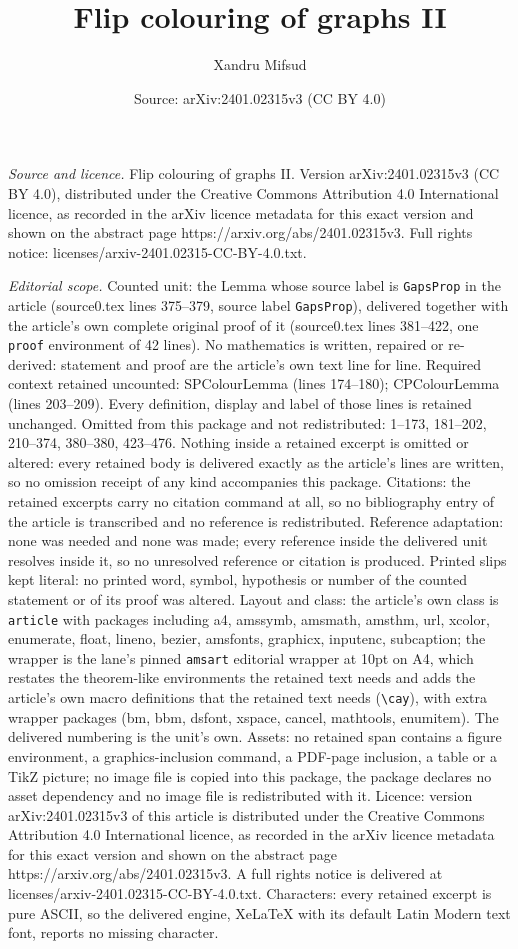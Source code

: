 \documentclass[10pt,a4paper]{amsart}
\title[Flip colouring of graphs II]{Flip colouring of graphs II}
\author{Xandru Mifsud}
\date{Source: arXiv:2401.02315v3 (CC BY 4.0)}
\begin{document}
\maketitle

\noindent\emph{Source and licence.} Flip colouring of graphs II. Version arXiv:2401.02315v3 (CC BY 4.0), distributed under the Creative Commons Attribution 4.0 International licence, as recorded in the arXiv licence metadata for this exact version and shown on the abstract page https://arxiv.org/abs/2401.02315v3. Full rights notice: licenses/arxiv-2401.02315-CC-BY-4.0.txt.\par\smallskip

\noindent\textit{Editorial scope.} Counted unit: the Lemma whose source label is \texttt{GapsProp} in the article (source0.tex lines 375--379, source label \texttt{GapsProp}), delivered together with the article's own complete original proof of it (source0.tex lines 381--422, one \texttt{proof} environment of 42 lines). No mathematics is written, repaired or re-derived: statement and proof are the article's own text line for line. Required context retained uncounted: SPColourLemma (lines 174--180); CPColourLemma (lines 203--209). Every definition, display and label of those lines is retained unchanged. Omitted from this package and not redistributed: 1--173, 181--202, 210--374, 380--380, 423--476. Nothing inside a retained excerpt is omitted or altered: every retained body is delivered exactly as the article's lines are written, so no omission receipt of any kind accompanies this package. Citations: the retained excerpts carry no citation command at all, so no bibliography entry of the article is transcribed and no reference is redistributed. Reference adaptation: none was needed and none was made; every reference inside the delivered unit resolves inside it, so no unresolved reference or citation is produced. Printed slips kept literal: no printed word, symbol, hypothesis or number of the counted statement or of its proof was altered. Layout and class: the article's own class is \texttt{article} with packages including a4, amssymb, amsmath, amsthm, url, xcolor, enumerate, float, lineno, bezier, amsfonts, graphicx, inputenc, subcaption; the wrapper is the lane's pinned \texttt{amsart} editorial wrapper at 10pt on A4, which restates the theorem-like environments the retained text needs and adds the article's own macro definitions that the retained text needs (\texttt{\textbackslash cay}), with extra wrapper packages (bm, bbm, dsfont, xspace, cancel, mathtools, enumitem). The delivered numbering is the unit's own. Assets: no retained span contains a figure environment, a graphics-inclusion command, a PDF-page inclusion, a table or a TikZ picture; no image file is copied into this package, the package declares no asset dependency and no image file is redistributed with it. Licence: version arXiv:2401.02315v3 of this article is distributed under the Creative Commons Attribution 4.0 International licence, as recorded in the arXiv licence metadata for this exact version and shown on the abstract page https://arxiv.org/abs/2401.02315v3. A full rights notice is delivered at licenses/arxiv-2401.02315-CC-BY-4.0.txt. Characters: every retained excerpt is pure ASCII, so the delivered engine, XeLaTeX with its default Latin Modern text font, reports no missing character.
\end{document}
